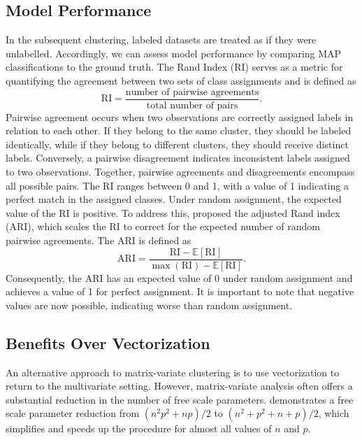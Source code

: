 \documentclass[12pt]{report}
\begin{document}
\subsection{Model Performance}
In the subsequent clustering, labeled datasets are treated as if they were unlabelled. Accordingly, we can assess model performance by comparing MAP classifications to the ground truth. The Rand Index (RI) \citep{rand1971} serves as a metric for quantifying the agreement between two sets of class assignments and is defined as
\begin{equation*}
\text{RI} = \frac{\text{number of pairwise agreements}}{\text{total number of pairs}}.
\end{equation*} 
Pairwise agreement occurs when two observations are correctly assigned labels in relation to each other. If they belong to the same cluster, they should be labeled identically, while if they belong to different clusters, they should receive distinct labels. Conversely, a pairwise disagreement indicates inconsistent labels assigned to two observations. Together, pairwise agreements and disagreements encompass all possible pairs. The RI ranges between 0 and 1, with a value of 1 indicating a perfect match in the assigned classes. Under random assignment, the expected value of the RI is positive. To address this, \citet{hubert1985} proposed the adjusted Rand index (ARI), which scales the RI to correct for the expected number of random pairwise agreements. The ARI is defined as 
\begin{equation*}
\text{ARI} = \frac{\text{RI}  - \mathbb{E}[\text{RI} ]}{\max(\text{RI}) - \mathbb{E}[\text{RI} ]}.
\end{equation*} 
Consequently, the ARI has an expected value of 0 under random assignment and achieves a value of 1 for perfect assignment. It is important to note that negative values are now possible, indicating worse than random assignment.




\subsection{Benefits Over Vectorization}
An alternative approach to matrix-variate clustering is to use vectorization to return to the multivariate setting. However, matrix-variate analysis often offers a substantial reduction in the number of free scale parameters. \citet{gallaugher2018} demonstrates a free scale parameter reduction from $(n^2p^2 + np)/2$ to $(n^2 + p^2 + n + p)/2$, which simplifies and speeds up the procedure for almost all values of $n$ and $p$. 
 
\end{document}
